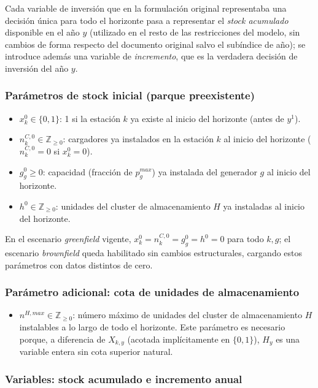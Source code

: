 \documentclass[11pt]{article}
\begin{document}
Cada variable de inversión que en la formulación original representaba una decisión única para todo el horizonte pasa a representar el \emph{stock acumulado} disponible en el año $y$ (utilizado en el resto de las restricciones del modelo, sin cambios de forma respecto del documento original salvo el subíndice de año); se introduce además una variable de \emph{incremento}, que es la verdadera decisión de inversión del año $y$.

\subsubsection*{Parámetros de stock inicial (parque preexistente)}

\begin{itemize}
    \item $x_k^{0}\in\{0,1\}$: 1 si la estación $k$ ya existe al inicio del horizonte (antes de $y^1$).
    \item $n_k^{C,0}\in\mathbb{Z}_{\geq0}$: cargadores ya instalados en la estación $k$ al inicio del horizonte ($n_k^{C,0}=0$ si $x_k^0=0$).
    \item $g_g^{0}\geq0$: capacidad (fracción de $p^{max}_g$) ya instalada del generador $g$ al inicio del horizonte.
    \item $h^{0}\in\mathbb{Z}_{\geq0}$: unidades del cluster de almacenamiento $H$ ya instaladas al inicio del horizonte.
\end{itemize}

\noindent En el escenario \textit{greenfield} vigente, $x_k^0=n_k^{C,0}=g_g^0=h^0=0$ para todo $k,g$; el escenario \textit{brownfield} queda habilitado sin cambios estructurales, cargando estos parámetros con datos distintos de cero.

\subsubsection*{Parámetro adicional: cota de unidades de almacenamiento}

\begin{itemize}
    \item $n^{H,max}\in\mathbb{Z}_{\geq0}$: número máximo de unidades del cluster de almacenamiento $H$ instalables a lo largo de todo el horizonte. Este parámetro es necesario porque, a diferencia de $X_{k,y}$ (acotada implícitamente en $\{0,1\}$), $H_{y}$ es una variable entera sin cota superior natural.
\end{itemize}

\subsubsection*{Variables: stock acumulado e incremento anual}
\end{document}
